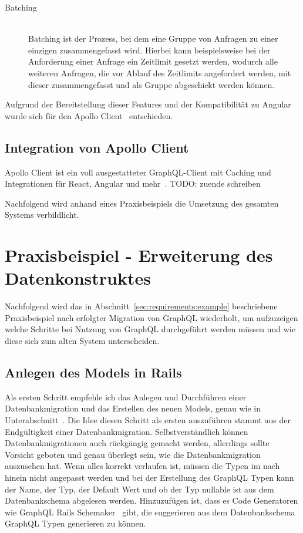\begin{description}
	\item[Batching\label{rest:overfetching}] \ \\
	Batching ist der Prozess, bei dem eine Gruppe von Anfragen zu einer einzigen zusammengefasst wird. Hierbei kann beispielsweise bei der Anforderung einer Anfrage ein Zeitlimit gesetzt werden, wodurch alle weiteren Anfragen, die vor Ablauf des Zeitlimits angefordert werden, mit dieser zusammengefasst und als Gruppe abgeschickt werden können.
\end{description}

 Aufgrund der Bereitstellung dieser Features und der Kompatibilität zu Angular~\cite{apollo-angular-doc} wurde sich für den Apollo Client~\cite{apollo-angular} entschieden.

\subsection{Integration von Apollo Client}
Apollo Client ist ein voll ausgestatteter GraphQL-Client mit Caching und Integrationen für React, Angular und mehr~\cite{apollo-angular}.
TODO: zuende schreiben

Nachfolgend wird anhand eines Praxisbeispiels die Umsetzung des gesamten Systems verbildlicht.
\section{Praxisbeispiel - Erweiterung des Datenkonstruktes}
Nachfolgend wird das in Abschnitt~\ref{sec:requirements:example} beschriebene Praxisbeispiel nach erfolgter Migration von GraphQL wiederholt, um aufzuzeigen welche Schritte bei Nutzung von GraphQL durchgeführt werden müssen und wie diese sich zum alten System unterscheiden.

\subsection{Anlegen des Models in Rails}
\label{impl:graphql:model}
Als ersten Schritt empfehle ich das Anlegen und Durchführen einer Datenbankmigration und das Erstellen des neuen Models, genau wie in Unterabschnitt~. Die Idee diesen Schritt als ersten auszuführen stammt aus der Endgültigkeit einer Datenbankmigration. Selbstverständlich können Datenbankmigrationen auch rückgängig gemacht werden, allerdings sollte Vorsicht geboten und genau überlegt sein, wie die Datenbankmigration auszusehen hat. Wenn alles korrekt verlaufen ist, müssen die Typen im nach hinein nicht angepasst werden und bei der Erstellung des GraphQL Typen kann der Name, der Typ, der Default Wert und ob der Typ nullable ist aus dem Datenbankschema abgelesen werden. Hinzuzufügen ist, dass es Code Generatoren wie GraphQL Rails Schemaker~\cite{graphql-rails-schemaker} gibt, die suggerieren aus dem Datenbankschema GraphQL Typen generieren zu können.


